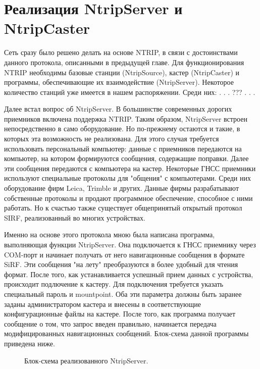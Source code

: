 \documentclass[a4paper,12pt]{report}
\begin{document}
\section{Реализация NtripServer и NtripCaster}
\par Сеть сразу было решено делать на основе NTRIP, в связи с достоинствами данного протокола, описанными в предыдущей главе. Для функционирования
NTRIP необходимы базовые станции (NtripSource), кастер (NtripCaster) и программы, обеспечивающие их взаимодействие (NtripServer). Некоторое 
количество станций уже имеется в нашем распоряжении. Среди них: . . . ??? . . . \par
Далее встал вопрос об NtripServer. В большинстве современных дорогих приемников включена поддержка NTRIP. Таким образом, NtripServer встроен 
непосредственно в само оборудование. Но по-прежнему остаются и такие, в которых эта возможность не реализована. Для этого случая требуется 
использовать персональный компьютер: данные с приемников передаются на компьютер, на котором формируются сообщения, содержащие поправки. 
Далее эти сообщения передаются с компьютера на кастер. Некоторые ГНСС приемники используют специальные протоколы для "общения" с компьютерами. 
Среди них оборудование фирм Leica, Trimble и других. Данные фирмы разрабатывают собственные протоколы и продают программное обеспечение, 
способное с ними работать. Но к счастью также существует общепринятый открытый протокол SIRF, реализованный во многих устройствах. \par
Именно на основе этого протокола мною была написана программа, выполняющая функции NtripServer. Она подключается к ГНСС приемнику через 
COM-порт и начинает получать от него навигационные сообщения в формате SiRF. Эти сообщения "на лету" преобразуются в более удобный для чтения 
формат. После того, как устанавливается успешный прием данных с устройства, происходит подлючение к кастеру. Для подключения требуется указать 
специальный пароль и mountpoint. Оба эти параметра должны быть заранее заданы администратором кастера и внесены в соответствующие 
конфигурационные файлы на кастере. После того, как программа получает сообщение о том, что запрос введен правильно, начинается передача 
модифицированных навигационных сообщений. Блок-схема данной программы приведена ниже.

\begin{figure}[h]
\caption{Блок-схема реализованного NtripServer.}
\label{ntrip}
\end{figure}
\end{document}
